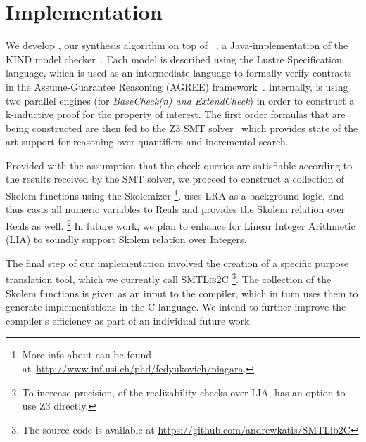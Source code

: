 \section{Implementation}
\label{sec:impl}

We develop \jkindsynt, our synthesis algorithm on top of \jkind~\cite{jkind},
a Java-implementation of the \textsc{KIND} model
checker~\cite{Hagen08:kind}. Each model is described using the Lustre
Specification language, which is used as an intermediate language to formally verify contracts in the
Assume-Guarantee Reasoning (\textsc{AGREE}) framework~\cite{NFM2012:CoGaMiWhLaLu}.
Internally, \jkind is using two parallel engines (for \textit{BaseCheck(n) and
\textit{ExtendCheck}}) in order to construct a k-inductive proof for the
property of interest.
The first order formulas that are being constructed are then fed to the \textsc{Z3} SMT
solver~\cite{DeMoura08:z3} which provides state of the art support for reasoning
over quantifiers and incremental search.

Provided with the assumption that the check queries are satisfiable according to
the results received by the SMT solver, we proceed to construct a collection of
Skolem functions using the \aeval Skolemizer%
\footnote{More info about \aeval can be found
  at~\url{http://www.inf.usi.ch/phd/fedyukovich/niagara}.}.
\aeval  uses LRA as a background logic, and thus casts all numeric variables to Reals and provides the Skolem relation over Reals as well.%
\footnote{To increase precision, of the realizability checks over LIA, \jkind has an option to use \textsc{Z3} directly.}
In future work, we plan to enhance  \aeval for Linear Integer Arithmetic (LIA) to soundly support Skolem relation over Integers.

The final step of our implementation involved the creation of a specific purpose
translation tool, which we currently call \textsc{SMTLib2C}%
\footnote{The source code
is available at \url{https://github.com/andrewkatis/SMTLib2C}}. The collection
of the Skolem functions is given as an input to the compiler, which in turn uses
them to generate implementations in the C language. We intend to further improve
the compiler's efficiency as part of an individual future
work. 



